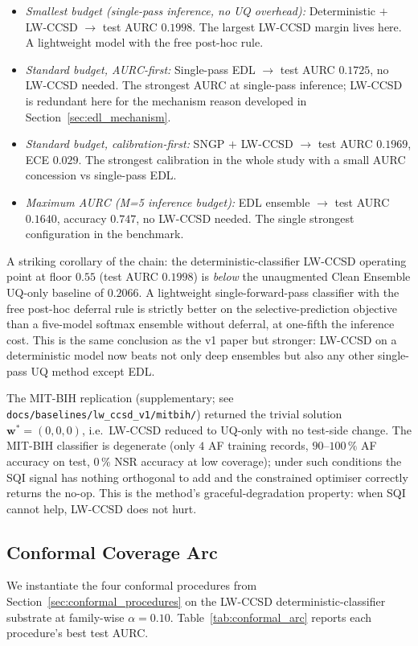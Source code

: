 \documentclass[journal]{IEEEtran}
\begin{document}
\begin{itemize}
\item \emph{Smallest budget (single-pass inference, no UQ overhead):} Deterministic $+$ LW-CCSD $\to$ test AURC $0.1998$. The largest LW-CCSD margin lives here. A lightweight model with the free post-hoc rule.
\item \emph{Standard budget, AURC-first:} Single-pass EDL $\to$ test AURC $0.1725$, no LW-CCSD needed. The strongest AURC at single-pass inference; LW-CCSD is redundant here for the mechanism reason developed in Section~\ref{sec:edl_mechanism}.
\item \emph{Standard budget, calibration-first:} SNGP $+$ LW-CCSD $\to$ test AURC $0.1969$, ECE $0.029$. The strongest calibration in the whole study with a small AURC concession vs single-pass EDL.
\item \emph{Maximum AURC (M{=}5 inference budget):} EDL ensemble $\to$ test AURC $\mathbf{0.1640}$, accuracy $\mathbf{0.747}$, no LW-CCSD needed. The single strongest configuration in the benchmark.
\end{itemize}

A striking corollary of the chain: the deterministic-classifier LW-CCSD operating point at floor $0.55$ (test AURC $0.1998$) is \emph{below} the unaugmented Clean Ensemble UQ-only baseline of $0.2066$. A lightweight single-forward-pass classifier with the free post-hoc deferral rule is strictly better on the selective-prediction objective than a five-model softmax ensemble without deferral, at one-fifth the inference cost. This is the same conclusion as the v1 paper but stronger: LW-CCSD on a deterministic model now beats not only deep ensembles but also any other single-pass UQ method except EDL.

The MIT-BIH replication (supplementary; see \texttt{docs/baselines/lw\_ccsd\_v1/mitbih/}) returned the trivial solution $\mathbf{w}^{*} = (0, 0, 0)$, i.e.\ LW-CCSD reduced to UQ-only with no test-side change. The MIT-BIH classifier is degenerate (only $4$ AF training records, $90$--$100\,\%$ AF accuracy on test, $0\,\%$ NSR accuracy at low coverage); under such conditions the SQI signal has nothing orthogonal to add and the constrained optimiser correctly returns the no-op. This is the method's graceful-degradation property: when SQI cannot help, LW-CCSD does not hurt.

\subsection{Conformal Coverage Arc}
\label{sec:conformal_arc}
We instantiate the four conformal procedures from Section~\ref{sec:conformal_procedures} on the LW-CCSD deterministic-classifier substrate at family-wise $\alpha = 0.10$. Table~\ref{tab:conformal_arc} reports each procedure's best test AURC.
\end{document}
